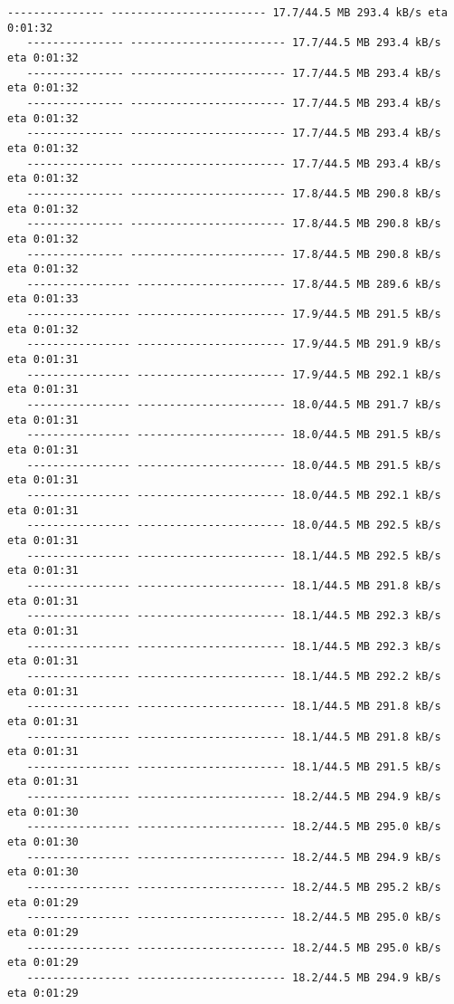 \documentclass[11pt]{article}
\begin{document}
\begin{Verbatim}[commandchars=\\\{\}]
   --------------- ------------------------ 17.7/44.5 MB 293.4 kB/s eta 0:01:32
   --------------- ------------------------ 17.7/44.5 MB 293.4 kB/s eta 0:01:32
   --------------- ------------------------ 17.7/44.5 MB 293.4 kB/s eta 0:01:32
   --------------- ------------------------ 17.7/44.5 MB 293.4 kB/s eta 0:01:32
   --------------- ------------------------ 17.7/44.5 MB 293.4 kB/s eta 0:01:32
   --------------- ------------------------ 17.7/44.5 MB 293.4 kB/s eta 0:01:32
   --------------- ------------------------ 17.8/44.5 MB 290.8 kB/s eta 0:01:32
   --------------- ------------------------ 17.8/44.5 MB 290.8 kB/s eta 0:01:32
   --------------- ------------------------ 17.8/44.5 MB 290.8 kB/s eta 0:01:32
   ---------------- ----------------------- 17.8/44.5 MB 289.6 kB/s eta 0:01:33
   ---------------- ----------------------- 17.9/44.5 MB 291.5 kB/s eta 0:01:32
   ---------------- ----------------------- 17.9/44.5 MB 291.9 kB/s eta 0:01:31
   ---------------- ----------------------- 17.9/44.5 MB 292.1 kB/s eta 0:01:31
   ---------------- ----------------------- 18.0/44.5 MB 291.7 kB/s eta 0:01:31
   ---------------- ----------------------- 18.0/44.5 MB 291.5 kB/s eta 0:01:31
   ---------------- ----------------------- 18.0/44.5 MB 291.5 kB/s eta 0:01:31
   ---------------- ----------------------- 18.0/44.5 MB 292.1 kB/s eta 0:01:31
   ---------------- ----------------------- 18.0/44.5 MB 292.5 kB/s eta 0:01:31
   ---------------- ----------------------- 18.1/44.5 MB 292.5 kB/s eta 0:01:31
   ---------------- ----------------------- 18.1/44.5 MB 291.8 kB/s eta 0:01:31
   ---------------- ----------------------- 18.1/44.5 MB 292.3 kB/s eta 0:01:31
   ---------------- ----------------------- 18.1/44.5 MB 292.3 kB/s eta 0:01:31
   ---------------- ----------------------- 18.1/44.5 MB 292.2 kB/s eta 0:01:31
   ---------------- ----------------------- 18.1/44.5 MB 291.8 kB/s eta 0:01:31
   ---------------- ----------------------- 18.1/44.5 MB 291.8 kB/s eta 0:01:31
   ---------------- ----------------------- 18.1/44.5 MB 291.5 kB/s eta 0:01:31
   ---------------- ----------------------- 18.2/44.5 MB 294.9 kB/s eta 0:01:30
   ---------------- ----------------------- 18.2/44.5 MB 295.0 kB/s eta 0:01:30
   ---------------- ----------------------- 18.2/44.5 MB 294.9 kB/s eta 0:01:30
   ---------------- ----------------------- 18.2/44.5 MB 295.2 kB/s eta 0:01:29
   ---------------- ----------------------- 18.2/44.5 MB 295.0 kB/s eta 0:01:29
   ---------------- ----------------------- 18.2/44.5 MB 295.0 kB/s eta 0:01:29
   ---------------- ----------------------- 18.2/44.5 MB 294.9 kB/s eta 0:01:29

\end{Verbatim}
\end{document}
